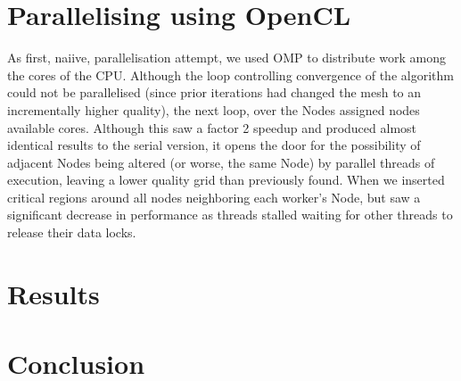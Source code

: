 \documentclass[a4paper,11pt, twocolumn]{article}
\begin{document}
\section{Parallelising using OpenCL}
As first, naiive, parallelisation attempt, we used OMP to distribute work among the cores of the CPU.  Although the loop controlling convergence of the algorithm could not be parallelised (since prior iterations had changed the mesh to an incrementally higher quality), the next loop, over the Nodes assigned nodes available cores.  Although this saw a factor 2 speedup and produced almost identical results to the serial version, it opens the door for the possibility of adjacent Nodes being altered (or worse, the same Node) by parallel threads of execution, leaving a lower quality grid than previously found.  When we inserted critical regions around all nodes neighboring each worker's Node, but saw a significant decrease in performance as threads stalled waiting for other threads to release their data locks.
\section{Results}
\section{Conclusion}


\end{document}
